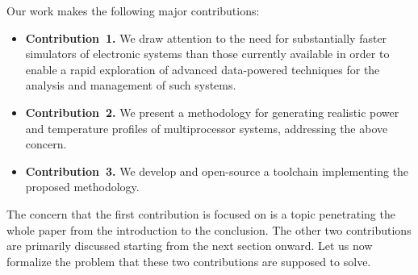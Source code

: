 Our work makes the following major contributions:

\begin{itemize}
  \item {\bfseries Contribution~1.} We draw attention to the need for
  substantially faster simulators of electronic systems than those currently
  available in order to enable a rapid exploration of advanced data-powered
  techniques for the analysis and management of such systems.

  \item {\bfseries Contribution~2.} We present a methodology for generating
  realistic power and temperature profiles of multiprocessor systems,
  addressing the above concern.

  \item {\bfseries Contribution~3.} We develop and open-source a toolchain
  implementing the proposed methodology.
\end{itemize}

The concern that the first contribution is focused on is a topic penetrating the
whole paper from the introduction to the conclusion. The other two contributions
are primarily discussed starting from the next section onward. Let us now
formalize the problem that these two contributions are supposed to solve.
